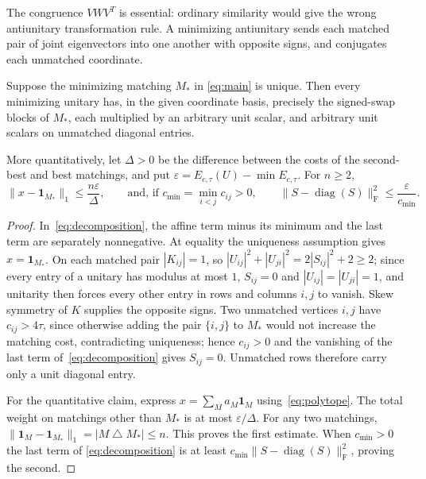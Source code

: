 \documentclass[11pt]{article}
\newcommand{\F}{\mathrm F}
\DeclareMathOperator{\diag}{diag}
\begin{document}
The congruence $VWV^T$ is essential: ordinary similarity would give the
wrong antiunitary transformation rule. A minimizing antiunitary sends
each matched pair of joint eigenvectors into one another with opposite
signs, and conjugates each unmatched coordinate.

\begin{proposition}\label{prop:rigidity}
Suppose the minimizing matching $M_*$ in \eqref{eq:main} is unique.
Then every minimizing unitary has, in the given coordinate basis,
precisely the signed-swap blocks of $M_*$, each multiplied by an
arbitrary unit scalar, and arbitrary unit scalars on unmatched diagonal
entries.

More quantitatively, let $\Delta>0$ be the difference between the costs
of the second-best and best matchings, and put
$\varepsilon=E_{c,\tau}(U)-\min E_{c,\tau}$. For $n\geq2$,
\begin{equation}\label{eq:stability}
 \|x-\mathbf1_{M_*}\|_1\leq\frac{n\varepsilon}{\Delta},
 \qquad\text{and, if }c_{\min}=\min_{i<j}c_{ij}>0,\qquad
 \|S-\diag(S)\|_\F^2\leq\frac{\varepsilon}{c_{\min}}.
\end{equation}
\end{proposition}
\begin{proof}
In~\eqref{eq:decomposition}, the affine term minus its minimum and the
last term are separately nonnegative. At equality the uniqueness
assumption gives $x=\mathbf1_{M_*}$. On each matched pair $|K_{ij}|=1$,
so $|U_{ij}|^2+|U_{ji}|^2=2|S_{ij}|^2+2\geq2$; since every entry of a
unitary has modulus at most $1$, $S_{ij}=0$ and $|U_{ij}|=|U_{ji}|=1$,
and unitarity then forces every other entry in rows and columns $i,j$
to vanish. Skew symmetry of $K$ supplies the opposite signs. Two
unmatched vertices $i,j$ have $c_{ij}>4\tau$, since otherwise adding
the pair $\{i,j\}$ to $M_*$ would not increase the matching cost,
contradicting uniqueness; hence $c_{ij}>0$ and the vanishing of the
last term of~\eqref{eq:decomposition} gives $S_{ij}=0$. Unmatched rows
therefore carry only a unit diagonal entry.

For the quantitative claim, express
$x=\sum_M a_M\mathbf1_M$ using~\eqref{eq:polytope}. The total weight on
matchings other than $M_*$ is at most $\varepsilon/\Delta$.
For any two matchings,
$\|\mathbf1_M-\mathbf1_{M_*}\|_1=|M\mathbin\triangle M_*|\leq n$.
This proves the first estimate. When $c_{\min}>0$ the last term of
\eqref{eq:decomposition} is at least
$c_{\min}\|S-\diag(S)\|_\F^2$, proving the second.
\end{proof}
\end{document}

